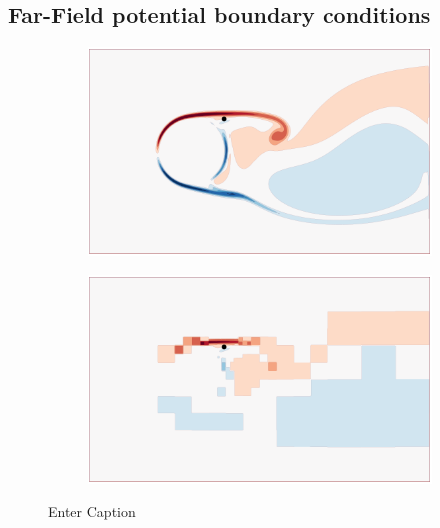\documentclass{article}
\begin{document}
\subsection{Far-Field potential boundary conditions}

\begin{figure}
    \centering
    \begin{subfigure}{.5\textwidth}
        \centering
        \includegraphics[width=\textwidth]{tex//fig/full_vort.png}
    \end{subfigure}%
    \begin{subfigure}{.5\textwidth}
        \centering
        \includegraphics[width=\textwidth]{tex/fig/multilevel_vort.png}
    \end{subfigure}
    \caption{Enter Caption}
    \label{fig:ml_array}
\end{figure}
\end{document}
